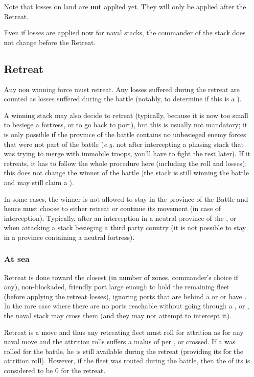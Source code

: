Note that losses on land are \textbf{not} applied yet. They will only be
applied after the Retreat.

Even if losses are applied now for naval stacks, the commander of the stack
does not change before the Retreat.

\subsection{Retreat}
\label{chMilitary:Battle:Retreat}
Any non winning force must retreat. Any losses suffered during the retreat are
counted as losses suffered during the battle (notably, to determine if this is
a ).

A winning stack may also decide to retreat (typically, because it is now too
small to besiege a fortress, or to go back to port), but this is usually not
mandatory; it is only possible if the province of the battle contains no
unbesieged enemy forces that were not part of the battle (\emph{e.g.} not
after intercepting a phasing stack that was trying to merge with immobile
troops, you'll have to fight the rest later). If it retreats, it has to follow
the whole procedure here (including the roll and losses); this does not change
the winner of the battle (the stack is still winning the battle and may still
claim a ).

In some cases, the winner is not allowed to stay in the province of the Battle
and hence must choose to either retreat or continue its movement (in case of
interception). Typically, after an interception in a neutral province of the
\HRE, or when attacking a stack besieging a third party country (it is not
possible to stay in a province containing a neutral fortress).

\subsubsection{At sea}
Retreat is done toward the closest (in number of zones, commander's choice if
any), non-blockaded, friendly port large enough to hold the remaining fleet
(before applying the retreat losses), ignoring ports that are behind a
\Presidio or \StraitFort or have \USURE. In the rare case where there are no
ports reachable without going through a \Presidio, \StraitFort or \USURE, the
naval stack may cross them (and they may not attempt to intercept it).

Retreat is a move and thus any retreating fleet must roll for attrition as for
any naval move and the attrition rolls suffers a malus of  per
\Presidio, \StraitFort or \USURE crossed. If a  \LeaderA
was rolled for the battle, he is still available during the retreat (providing
its \Man for the attrition roll). However, if the fleet was routed during the
battle, then the \Man of its \LeaderA is considered to be 0 for the retreat.

